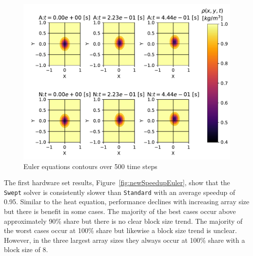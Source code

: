\documentclass[journal,article,submit,moreauthors,pdftex]{Definitions/mdpi}
\def\Swept{\texttt{Swept}}
\def\Standard{\texttt{Standard}}
\newcommand\fs{1}
\begin{document}
\begin{figure}
    \widefigure
    \begin{center}
       \includegraphics[scale=\fs, trim={0.75cm 0.4cm 0.2cm 0.2cm},clip]{figs/eulerValidate.pdf}
    \caption{Euler equations contours over 500 time steps}
    \label{fig:eulerSurface} 
    \end{center}
\end{figure}
\begin{paracol}{2}
\linenumbers
\switchcolumn

The first hardware set results, Figure~\ref{fig:newSpeedupEuler}, show that the \Swept{} solver is consistently slower than \Standard{} with an average speedup of 0.95. Similar to the heat equation, performance declines with increasing array size but there is benefit in some cases. The majority of the best cases occur above approximately 90\% share but there is no clear block size trend. The majority of the worst cases occur at 100\% share but likewise a block size trend is unclear. However, in the three largest array sizes they always occur at 100\% share with a block size of 8.

\end{paracol}
\end{document}
